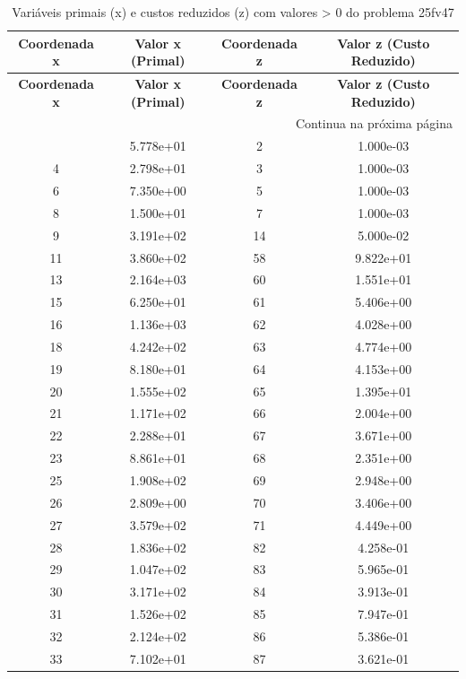 \documentclass[12pt]{article}
\begin{document}
\begin{longtable}{@{}cccc@{}}
\caption{Variáveis primais (x) e custos reduzidos (z) com valores > 0 do problema 25fv47} \\
\toprule
\textbf{Coordenada x} & \textbf{Valor x (Primal)} & \textbf{Coordenada z} & \textbf{Valor z (Custo Reduzido)} \\
\midrule
\endfirsthead

\toprule
\textbf{Coordenada x} & \textbf{Valor x (Primal)} & \textbf{Coordenada z} & \textbf{Valor z (Custo Reduzido)} \\
\midrule
\endhead

\midrule \multicolumn{4}{r}{{Continua na próxima página}} \\ \midrule
\endfoot

\bottomrule
\endlastfoot
1 & 5.778e+01 & 2 & 1.000e-03 \\
4 & 2.798e+01 & 3 & 1.000e-03 \\
6 & 7.350e+00 & 5 & 1.000e-03 \\
8 & 1.500e+01 & 7 & 1.000e-03 \\
9 & 3.191e+02 & 14 & 5.000e-02 \\
11 & 3.860e+02 & 58 & 9.822e+01 \\
13 & 2.164e+03 & 60 & 1.551e+01 \\
15 & 6.250e+01 & 61 & 5.406e+00 \\
16 & 1.136e+03 & 62 & 4.028e+00 \\
18 & 4.242e+02 & 63 & 4.774e+00 \\
19 & 8.180e+01 & 64 & 4.153e+00 \\
20 & 1.555e+02 & 65 & 1.395e+01 \\
21 & 1.171e+02 & 66 & 2.004e+00 \\
22 & 2.288e+01 & 67 & 3.671e+00 \\
23 & 8.861e+01 & 68 & 2.351e+00 \\
25 & 1.908e+02 & 69 & 2.948e+00 \\
26 & 2.809e+00 & 70 & 3.406e+00 \\
27 & 3.579e+02 & 71 & 4.449e+00 \\
28 & 1.836e+02 & 82 & 4.258e-01 \\
29 & 1.047e+02 & 83 & 5.965e-01 \\
30 & 3.171e+02 & 84 & 3.913e-01 \\
31 & 1.526e+02 & 85 & 7.947e-01 \\
32 & 2.124e+02 & 86 & 5.386e-01 \\
33 & 7.102e+01 & 87 & 3.621e-01 \\

\end{longtable}
\end{document}
